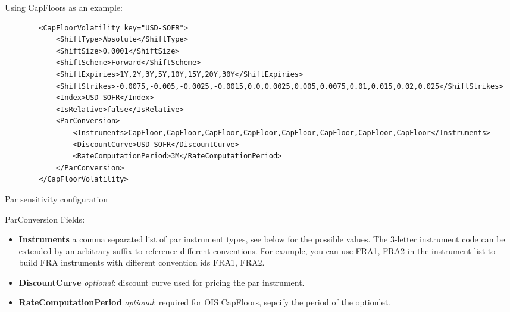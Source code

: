 Using CapFloors as an example:

\begin{longlisting}
  \begin{verbatim}
		<CapFloorVolatility key="USD-SOFR">
			<ShiftType>Absolute</ShiftType>
			<ShiftSize>0.0001</ShiftSize>
			<ShiftScheme>Forward</ShiftScheme>
			<ShiftExpiries>1Y,2Y,3Y,5Y,10Y,15Y,20Y,30Y</ShiftExpiries>
			<ShiftStrikes>-0.0075,-0.005,-0.0025,-0.0015,0.0,0.0025,0.005,0.0075,0.01,0.015,0.02,0.025</ShiftStrikes>
			<Index>USD-SOFR</Index>
			<IsRelative>false</IsRelative>
			<ParConversion>
				<Instruments>CapFloor,CapFloor,CapFloor,CapFloor,CapFloor,CapFloor,CapFloor,CapFloor</Instruments>
				<DiscountCurve>USD-SOFR</DiscountCurve>
				<RateComputationPeriod>3M</RateComputationPeriod>
			</ParConversion>
		</CapFloorVolatility>
\end{verbatim}
\caption{Par sensitivity configuration}
\label{lst:par_sensitivity_config}
\end{longlisting}


ParConversion Fields:

\begin{itemize}
\item \textbf{Instruments} a comma separated list of par instrument types, see below for the possible values. The
  3-letter instrument code can be extended by an arbitrary suffix to reference different conventions. For example, you
  can use FRA1, FRA2 in the instrument list to build FRA instruments with different convention ids FRA1, FRA2.
\item \textbf{DiscountCurve} \textit{optional}: discount curve used for pricing the par instrument.
\item \textbf{RateComputationPeriod} \textit{optional}: required for OIS CapFloors, sepcify the period of the optionlet.
\end{itemize}


